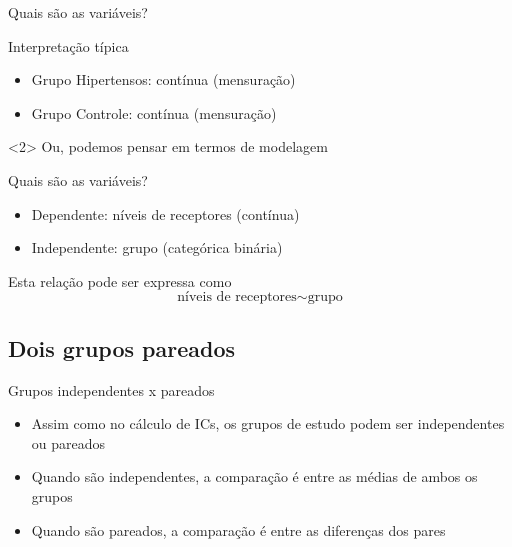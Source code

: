 \documentclass{beamer}
\begin{document}
\begin{frame}{Quais são as variáveis?}
  \begin{block}{Interpretação típica}
    \begin{itemize}
    \item Grupo Hipertensos: contínua (mensuração)
    \item Grupo Controle: contínua (mensuração)
    \end{itemize}
  \end{block}
  \vfill
  \begin{block}{}<2>
    Ou, podemos pensar em termos de modelagem
  \end{block}
\end{frame}

\begin{frame}{Quais são as variáveis?}
  \begin{itemize}
  \item Dependente: níveis de receptores (contínua)
  \item Independente: grupo (categórica binária)
  \end{itemize}
  \vfill
  \begin{block}{Esta relação pode ser expressa como}
    \begin{displaymath}
      \text{níveis de receptores} \sim \text{grupo}
    \end{displaymath}
  \end{block}
\end{frame}

\subsection{Dois grupos pareados}

\begin{frame}{Grupos independentes x pareados}
  \begin{itemize}
  \item Assim como no cálculo de ICs, os grupos de estudo podem ser independentes ou pareados
  \item Quando são independentes, a comparação é entre as médias de ambos os grupos
  \item Quando são pareados, a comparação é entre as diferenças dos pares
  \end{itemize}
\end{frame}
\end{document}
